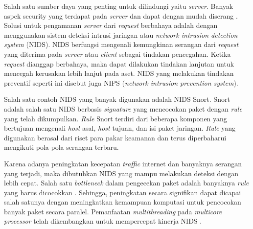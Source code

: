 \documentclass[conference]{IEEEtran}
\begin{document}


Salah satu sumber daya yang penting untuk dilindungi yaitu \emph{server}. Banyak aspek security yang terdapat pada \emph{server} dan dapat dengan mudah diserang \cite{owasp}. Solusi untuk pengamanan \emph{server} dari \emph{request} berbahaya adalah dengan menggunakan sistem deteksi intrusi jaringan atau \emph{network intrusion detection system} (NIDS). NIDS berfungsi mengenali kemungkinan serangan dari \emph{request} yang diterima pada \emph{server} atau \emph{client} sebagai tindakan pencegahan. Ketika \emph{request} dianggap berbahaya, maka dapat dilakukan tindakan lanjutan untuk mencegah kerusakan lebih lanjut pada aset. NIDS yang melakukan tindakan preventif seperti ini disebut juga NIPS (\emph{network intrusion prevention system}).

Salah satu contoh NIDS yang banyak digunakan adalah NIDS Snort. Snort adalah salah satu NIDS berbasis \emph{signature} yang mencocokan paket dengan \emph{rule} yang telah dikumpulkan. \emph{Rule} Snort terdiri dari beberapa komponen yang bertujuan mengenali \emph{host} asal, \emph{host} tujuan, dan isi paket jaringan. \emph{Rule} yang digunakan berasal dari riset para pakar keamanan dan terus diperbaharui mengikuti pola-pola serangan terbaru.

Karena adanya peningkatan kecepatan \emph{traffic} internet dan banyaknya serangan yang terjadi, maka dibutuhkan NIDS yang mampu melakukan deteksi dengan lebih cepat. Salah satu \emph{bottleneck} dalam pengecekan paket adalah banyaknya \emph{rule} yang harus dicocokkan \cite{pcre2007}. Sehingga, peningkatan secara signifikan dapat dicapai salah satunya dengan meningkatkan kemampuan komputasi untuk pencocokan banyak paket secara paralel. Pemanfaatan \emph{multithreading} pada \emph{multicore processor} telah dikembangkan untuk mempercepat kinerja NIDS \cite{multi2004}.
\end{document}

